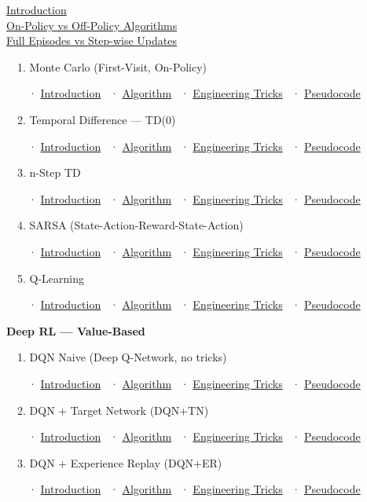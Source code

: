 \documentclass[11pt]{article}
\begin{document}
  \hyperref[model-free-intro]{Introduction}\\
  \hyperref[on-off-policy-intro]{On-Policy vs Off-Policy Algorithms}\\
  \hyperref[full-episodes-intro]{Full Episodes vs Step-wise Updates}

   1. Monte Carlo (First-Visit, On-Policy)

   ~~· \hyperref[intro-2-1]{Introduction} ~·
\hyperref[monte-carlo-first-visit]{Algorithm} ~·
\hyperref[tricks-2-1]{Engineering Tricks} ~·
\hyperref[pseudo-2-1]{Pseudocode}

   2. Temporal Difference --- TD(0)

   ~~· \hyperref[intro-2-2]{Introduction} ~· \hyperref[td-0]{Algorithm}
~· \hyperref[tricks-2-2]{Engineering Tricks} ~·
\hyperref[pseudo-2-2]{Pseudocode}

   3. n-Step TD

   ~~· \hyperref[intro-2-3]{Introduction} ~·
\hyperref[n-step-td-algo]{Algorithm} ~·
\hyperref[tricks-2-3]{Engineering Tricks} ~·
\hyperref[pseudo-2-3]{Pseudocode}

   4. SARSA (State-Action-Reward-State-Action)

   ~~· \hyperref[intro-2-4]{Introduction} ~· \hyperref[sarsa]{Algorithm}
~· \hyperref[tricks-2-4]{Engineering Tricks} ~·
\hyperref[pseudo-2-4]{Pseudocode}

   5. Q-Learning

   ~~· \hyperref[intro-2-5]{Introduction} ~·
\hyperref[q-learning-algo]{Algorithm} ~·
\hyperref[tricks-2-5]{Engineering Tricks} ~·
\hyperref[pseudo-2-5]{Pseudocode}

  \textbf{Deep RL --- Value-Based}

   1. DQN Naive (Deep Q-Network, no tricks)

   ~~· \hyperref[intro-3-1]{Introduction} ~·
\hyperref[dqn-naive]{Algorithm} ~· \hyperref[tricks-3-1]{Engineering
Tricks} ~· \hyperref[pseudo-3-1]{Pseudocode}

   2. DQN + Target Network (DQN+TN)

   ~~· \hyperref[intro-3-2]{Introduction} ~·
\hyperref[dqn-target-network]{Algorithm} ~·
\hyperref[tricks-3-2]{Engineering Tricks} ~·
\hyperref[pseudo-3-2]{Pseudocode}

   3. DQN + Experience Replay (DQN+ER)

   ~~· \hyperref[intro-3-3]{Introduction} ~·
\hyperref[dqn-experience-replay]{Algorithm} ~·
\hyperref[tricks-3-3]{Engineering Tricks} ~·
\hyperref[pseudo-3-3]{Pseudocode}
\end{document}
